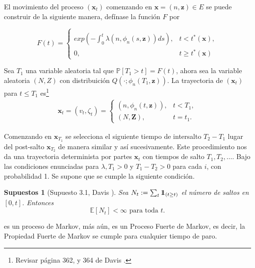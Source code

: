 \documentclass{article}
\newtheorem{Sup}{Supuestos}[section]
\newcommand{\esp}{\mathbb{E}}
\newcommand{\prob}{\mathbb{P}}
\newcommand{\indora}{\mbox{$1$\hspace{-0.8ex}$1$}}
\numberwithin{equation}{section}
\begin{document}
El movimiento del proceso $\left(\mathbf{x}_{t}\right)$ comenzando
en $\mathbf{x}=\left(n,\mathbf{z}\right)\in E$ se puede construir
de la siguiente manera, def\'inase la funci\'on $F$ por

\begin{equation}
F\left(t\right)=\left\{\begin{array}{ll}\\
exp\left(-\int_{0}^{t}\lambda\left(n,\phi_{n}\left(s,\mathbf{z}\right)\right)ds\right), & t<t^{*}\left(\mathbf{x}\right),\\
0, & t\geq t^{*}\left(\mathbf{x}\right)
\end{array}\right.
\end{equation}

Sea $T_{1}$ una variable aleatoria tal que
$\prob\left[T_{1}>t\right]=F\left(t\right)$, ahora sea la variable
aleatoria $\left(N,Z\right)$ con distribuici\'on
$Q\left(\cdot;\phi_{n}\left(T_{1},\mathbf{z}\right)\right)$. La
trayectoria de $\left(\mathbf{x}_{t}\right)$ para $t\leq T_{1}$
es\footnote{Revisar p\'agina 362, y 364 de Davis \cite{Davis}.}
\begin{eqnarray*}
\mathbf{x}_{t}=\left(v_{t},\zeta_{t}\right)=\left\{\begin{array}{ll}
\left(n,\phi_{n}\left(t,\mathbf{z}\right)\right), & t<T_{1},\\
\left(N,\mathbf{Z}\right), & t=t_{1}.
\end{array}\right.
\end{eqnarray*}

Comenzando en $\mathbf{x}_{T_{1}}$ se selecciona el siguiente
tiempo de intersalto $T_{2}-T_{1}$ lugar del post-salto
$\mathbf{x}_{T_{2}}$ de manera similar y as\'i sucesivamente. Este
procedimiento nos da una trayectoria determinista por partes
$\mathbf{x}_{t}$ con tiempos de salto $T_{1},T_{2},\ldots$. Bajo
las condiciones enunciadas para $\lambda,T_{1}>0$  y
$T_{1}-T_{2}>0$ para cada $i$, con probabilidad 1. Se supone que
se cumple la siguiente condici\'on.

\begin{Sup}[Supuesto 3.1, Davis \cite{Davis}]\label{Sup3.1.Davis}
Sea $N_{t}:=\sum_{t}\indora_{\left(t\geq t\right)}$ el n\'umero de
saltos en $\left[0,t\right]$. Entonces
\begin{equation}
\esp\left[N_{t}\right]<\infty\textrm{ para toda }t.
\end{equation}
\end{Sup}

es un proceso de Markov, m\'as a\'un, es un Proceso Fuerte de
Markov, es decir, la Propiedad Fuerte de Markov se cumple para
cualquier tiempo de paro.
\end{document}
